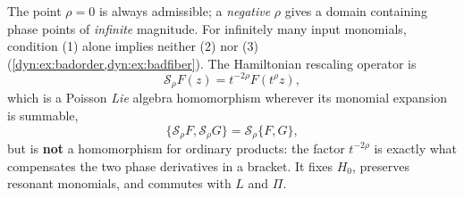 \documentclass[11pt,letterpaper]{article}
\theoremstyle{definition}
\theoremstyle{remark}
\numberwithin{equation}{section}
\begin{document}
The point $\rho=0$ is always admissible; a \emph{negative} $\rho$ gives a
domain containing phase points of \emph{infinite} magnitude. For infinitely
many input monomials, condition (1) alone implies neither (2) nor (3)
(\cref{dyn:ex:badorder,dyn:ex:badfiber}). The Hamiltonian rescaling
operator is
\begin{equation}\label{dyn:eq:S}
 \mathscr S_\rho F(z)=t^{-2\rho}F(t^{\rho}z),
\end{equation}
which is a Poisson \emph{Lie} algebra homomorphism wherever its monomial
expansion is summable,
\begin{equation}\label{dyn:eq:scalepb}
 \{\mathscr S_\rho F,\mathscr S_\rho G\}=\mathscr S_\rho\{F,G\},
\end{equation}
but is \textbf{not} a homomorphism for ordinary products: the factor
$t^{-2\rho}$ is exactly what compensates the two phase derivatives in a
bracket. It fixes $H_0$, preserves resonant monomials, and commutes with
$L$ and $\Pi$.
\end{document}
